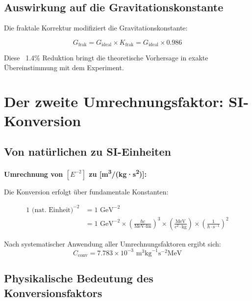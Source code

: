 	\subsection{Auswirkung auf die Gravitationskonstante}
	
	Die fraktale Korrektur modifiziert die Gravitationskonstante:
	
	\begin{equation}
		G_{\text{frak}} = G_{\text{ideal}} \times K_{\text{frak}} = G_{\text{ideal}} \times 0.986
	\end{equation}
	
	Diese ~1.4\% Reduktion bringt die theoretische Vorhersage in exakte Übereinstimmung mit dem Experiment.
	
	\section{Der zweite Umrechnungsfaktor: SI-Konversion}
	
	\subsection{Von natürlichen zu SI-Einheiten}
	
	\begin{dimensional}
		\textbf{Umrechnung von $[E^{-2}]$ zu [m\textsuperscript{3}/(kg·s\textsuperscript{2})]:}
		
		Die Konversion erfolgt über fundamentale Konstanten:
		
		\begin{align}
			1 \text{ (nat. Einheit)}^{-2} &= 1 \text{ GeV}^{-2} \\
			&= 1 \text{ GeV}^{-2} \times \left(\frac{\hbar c}{\text{MeV·fm}}\right)^3 \times \left(\frac{\text{MeV}}{c^2 \cdot \text{kg}}\right) \times \left(\frac{1}{\hbar \cdot \text{s}^{-1}}\right)^2
		\end{align}
		
		Nach systematischer Anwendung aller Umrechnungsfaktoren ergibt sich:
		\begin{equation}
			C_{\text{conv}} = 7.783 \times 10^{-3} \text{ m}^3\text{kg}^{-1}\text{s}^{-2}\text{MeV}
		\end{equation}
	\end{dimensional}
	
	\subsection{Physikalische Bedeutung des Konversionsfaktors}
	
